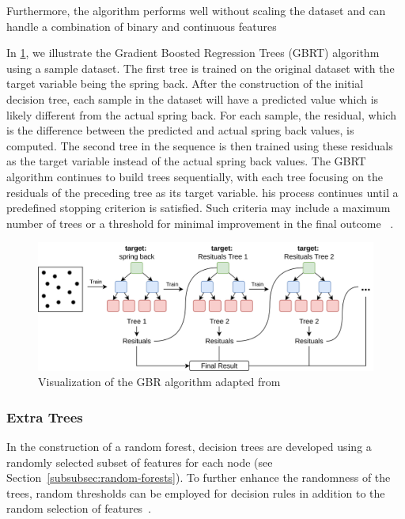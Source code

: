 {Furthermore, the algorithm performs well without scaling the dataset and can handle a combination of binary and
continuous features
~\cite[p. 91]{muller_introductionmachinelearning_2016}

In \cref{fig:gbr-example}, we illustrate the Gradient Boosted Regression Trees (GBRT) algorithm using a sample
dataset.
The first tree is trained on the original dataset with the target variable being the spring back.
After the construction of the initial decision tree, each sample in the dataset will have a predicted value which is
likely
different from the actual spring back.
For each sample, the residual, which is the difference between the predicted and actual spring back values, is
computed.
The second tree in the sequence is then trained using these residuals as the target variable instead of the
actual spring back values.
The GBRT algorithm continues to build trees sequentially, with each tree focusing on the residuals of the preceding
tree as its target variable.
his process continues until a predefined stopping criterion is satisfied.
Such criteria may include a maximum number of trees or a threshold for minimal improvement in the final
outcome
~\cite[p. 227]{boehmke2019hands}.

\begin{figure}[h]
    \begin{tcolorbox}[arc=0pt,boxrule=0.5pt]
        \centering
        \includegraphics[width=1\textwidth]{chap4/images/gradient_boosting_example}
    \end{tcolorbox}
    \caption{Visualization of the \ac{GBR} algorithm adapted from~\cite[p. 222]{boehmke2019hands}}
    \label{fig:gbr-example}
\end{figure}



\subsubsection{Extra Trees}\label{subsubsec:extra-trees}
In the construction of a random forest, decision trees are developed using a randomly selected subset of features for
each node (see Section~\ref{subsubsec:random-forests}). To further enhance the randomness of the trees, random
thresholds can be employed for decision rules in addition to the random selection of
features~\cite[p. 351]{geron2022hands}.

}
